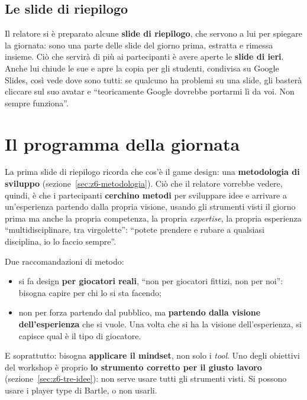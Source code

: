 \subsection{Le slide di riepilogo}

Il relatore si è preparato alcune \textbf{slide di riepilogo}, che servono a lui
per spiegare la giornata: sono una parte delle slide del giorno prima,
estratta e rimessa insieme. Ciò che servirà di più ai partecipanti è avere
aperte le \textbf{slide di ieri}. Anche lui chiude le sue e apre la copia per
gli studenti, condivisa su Google Slides, così vede dove sono tutti: se
qualcuno ha problemi su una slide, gli basterà cliccare sul suo avatar e
``teoricamente Google dovrebbe portarmi lì da voi. Non sempre funziona''.

\section{Il programma della giornata}
\label{z7:sec:programma}

La prima slide di riepilogo ricorda che cos'è il game design: una
\textbf{metodologia di sviluppo} (sezione~\ref{sec:z6-metodologia}). Ciò che il
relatore vorrebbe vedere, quindi, è che i partecipanti \textbf{cerchino metodi}
per sviluppare idee e arrivare a un'esperienza partendo dalla propria visione,
usando gli strumenti visti il giorno prima ma anche la propria competenza, la
propria \emph{expertise}, la propria esperienza ``multidisciplinare, tra
virgolette'': ``potete prendere e rubare a qualsiasi disciplina, io lo faccio
sempre''.

Due raccomandazioni di metodo:
\begin{itemize}
  \item si fa design \textbf{per giocatori reali}, ``non per giocatori fittizi,
        non per noi'': bisogna capire per chi lo si sta facendo;
  \item non per forza partendo dal pubblico, ma \textbf{partendo dalla visione
        dell'esperienza} che si vuole. Una volta che si ha la visione
        dell'esperienza, si capisce qual è il tipo di giocatore.
\end{itemize}
E soprattutto: bisogna \textbf{applicare il mindset}, non solo i \emph{tool}.
Uno degli obiettivi del workshop è proprio \textbf{lo strumento corretto per il
giusto lavoro} (sezione~\ref{sec:z6-tre-idee}): non serve usare tutti gli
strumenti visti. Si possono usare i player type di Bartle, o non usarli.

